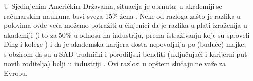 U Sjedinjenim Američkim Državama, situacija je obrnuta: u akademiji se računarskim naukama bavi svega 15\% žena \cite{way}. Neke od razloga zašto je razlika u polovima ovde veća možemo potražiti u činjenici da je razlika u plati izraženija u akademiji (i to za 50\% u odnosu na industriju, prema istraživanju koje su sproveli Ding i kolege \cite{ding}) i da je akademska karijera dosta nepovoljnija po (buduće) majke, s obzirom da su u SAD trudnički i porodiljski benefiti (uključujući i karijerni put novih roditelja) bolji u industriji \cite{morgan}. Ovi razlozi u opštem slučaju ne važe za Evropu.